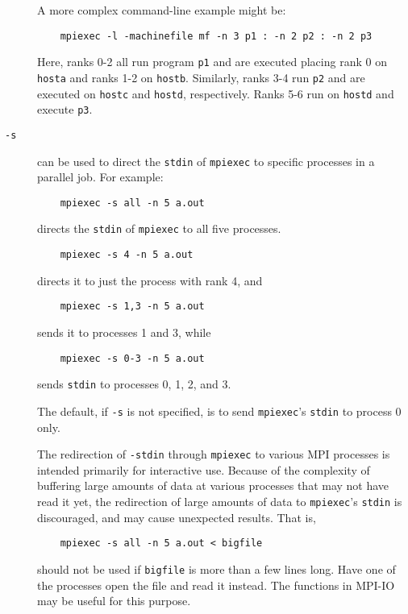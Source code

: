 \documentclass[dvipdfm,11pt]{article}
\begin{document}
\begin{description}
A more complex command-line example might be:
\begin{verbatim}
    mpiexec -l -machinefile mf -n 3 p1 : -n 2 p2 : -n 2 p3
\end{verbatim}
Here, ranks 0-2 all run program \texttt{p1} and are executed placing
rank 0 on \texttt{hosta} and ranks 1-2 on \texttt{hostb}.  Similarly,
ranks 3-4 run \texttt{p2} and are executed on \texttt{hostc} and
\texttt{hostd}, respectively.  Ranks 5-6 run on \texttt{hostd} and
execute \texttt{p3}.
\item[\texttt{-s}] can be used to direct the \texttt{stdin} of
  \texttt{mpiexec} to specific processes in a parallel job.  For
  example:
\begin{verbatim}
    mpiexec -s all -n 5 a.out
\end{verbatim}
directs the \texttt{stdin} of \texttt{mpiexec} to all five processes.
\begin{verbatim}
    mpiexec -s 4 -n 5 a.out 
\end{verbatim}
directs it to just the process with rank 4, and 
\begin{verbatim}
    mpiexec -s 1,3 -n 5 a.out 
\end{verbatim}
sends it to processes 1 and 3, while
\begin{verbatim}
    mpiexec -s 0-3 -n 5 a.out 
\end{verbatim}
sends \texttt{stdin} to processes 0, 1, 2, and 3.

The default, if \texttt{-s} is not specified, is to send
\texttt{mpiexec}'s \texttt{stdin} to process 0 only.

The redirection of \texttt{-stdin} through \texttt{mpiexec} to various MPI
processes is intended primarily for interactive use.  Because of the
complexity of buffering large amounts of data at various processes that
may not have read it yet, the redirection of large amounts of data to
\texttt{mpiexec}'s \texttt{stdin} is discouraged, and may cause
unexpected results.  That is, 
\begin{verbatim}
    mpiexec -s all -n 5 a.out < bigfile
\end{verbatim}
should not be used if \texttt{bigfile} is more than a few lines long.
Have one of the processes open the file and read it instead.  The
functions in MPI-IO may be useful for this purpose.



\end{description}
\end{document}
